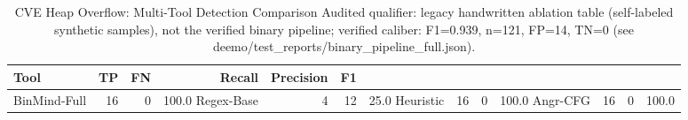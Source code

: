 \begin{table}[htbp]
\centering
\caption{CVE Heap Overflow: Multi-Tool Detection Comparison Audited qualifier: legacy handwritten ablation table (self-labeled synthetic samples), not the verified binary pipeline; verified caliber: F1=0.939, n=121, FP=14, TN=0 (see deemo/test_reports/binary_pipeline_full.json).}
\label{tab:cve-multi-tool}
\begin{tabular}{lrrrrr}
\toprule
Tool & TP & FN & Recall & Precision & F1 \\
\midrule
BinMind-Full & 16 & 0 & 100.0%
Regex-Base & 4 & 12 & 25.0%
Heuristic & 16 & 0 & 100.0%
Angr-CFG & 16 & 0 & 100.0%
\bottomrule
\end{tabular}
\end{table}
